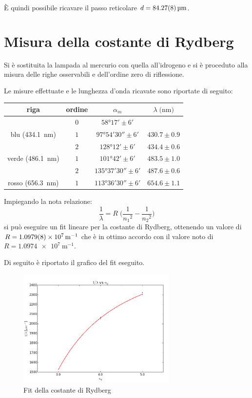 È quindi possibile ricavare il passo reticolare $d=	\SI{84.27 \pm 0.08}{\micro\meter}$.

\section{Misura della costante di Rydberg}
	Si è sostituita la lampada al mercurio con quella all'idrogeno e si è proceduto alla misura delle righe osservabili e dell'ordine zero di riflessione.
	
	Le misure effettuate e le lunghezza d'onda ricavate sono riportate di seguito:
	\smallskip
	\begin{table}[H]
	\centering
		\begin{tabular}{c|c|c|c}
			riga & ordine & $\alpha _{m}$ & $\lambda \;\text{(nm)}$ \\
		\hline
		& $ 0 $ &$\ang{58;17;} \pm 6' $ &\\
		\hline
		blu (\SI{434.1}{\nano\meter})& $ 1 $ &$\ang{97;54;30} \pm 6' $ & $430.7 \pm 0.9$\\
		\hline
		 & $ 2$ & $\ang{128;12;} \pm 6' $ &$434.4 \pm 0.6$\\
		\hline
		verde (\SI{486.1}{\nano\meter}) & $ 1$ & $\ang{101;42;} \pm 6' $ &$483.5 \pm 1.0$\\
		\hline
		 &$ 2$ & $\ang{135;37;30} \pm 6' $&$487.6 \pm 0.6$ \\
		\hline
		rosso (\SI{656.3}{\nano\meter})&$1$ & $\ang{113;36;30} \pm 6' $ &$654.6 \pm 1.1$\\
		\end{tabular}
	\end{table}
	\smallskip

	Impiegando la nota relazione:
	\smallskip
	\begin{equation*}\label{eq:ryd}
	\frac{1}{\lambda}=R\;\biggl(\frac{1}{{n_1}^2}-\frac{1}{{n_2}^2}\biggr)
	\end{equation*}
	\smallskip
si può eseguire un fit lineare per la costante di Rydberg, ottenendo un valore di $R= \SI{1.0979\pm0.0008e7}{\meter^{-1}}$ che è in ottimo accordo con il valore noto di $R= \SI{1.0974e7}{\meter^{-1}}$.

Di seguito è riportato il grafico del fit eseguito.

	\begin{figure} [H]
		\centering
		\includegraphics[width=0.7\textwidth]{../FIgs-tabs/fit_R.png}
		\caption{Fit della costante di Rydberg}
	\end{figure}

